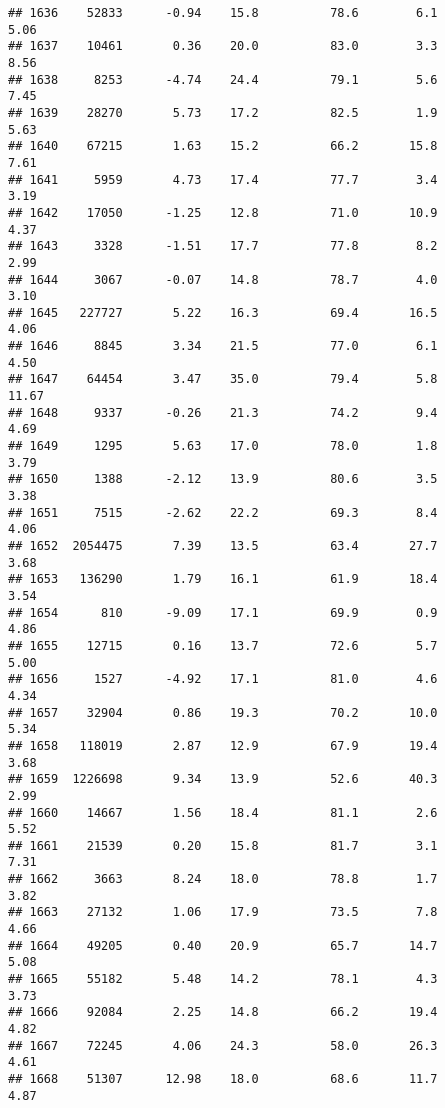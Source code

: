 \documentclass[
]{article}
\begin{document}
\begin{verbatim}
## 1636    52833      -0.94    15.8          78.6        6.1              5.06
## 1637    10461       0.36    20.0          83.0        3.3              8.56
## 1638     8253      -4.74    24.4          79.1        5.6              7.45
## 1639    28270       5.73    17.2          82.5        1.9              5.63
## 1640    67215       1.63    15.2          66.2       15.8              7.61
## 1641     5959       4.73    17.4          77.7        3.4              3.19
## 1642    17050      -1.25    12.8          71.0       10.9              4.37
## 1643     3328      -1.51    17.7          77.8        8.2              2.99
## 1644     3067      -0.07    14.8          78.7        4.0              3.10
## 1645   227727       5.22    16.3          69.4       16.5              4.06
## 1646     8845       3.34    21.5          77.0        6.1              4.50
## 1647    64454       3.47    35.0          79.4        5.8             11.67
## 1648     9337      -0.26    21.3          74.2        9.4              4.69
## 1649     1295       5.63    17.0          78.0        1.8              3.79
## 1650     1388      -2.12    13.9          80.6        3.5              3.38
## 1651     7515      -2.62    22.2          69.3        8.4              4.06
## 1652  2054475       7.39    13.5          63.4       27.7              3.68
## 1653   136290       1.79    16.1          61.9       18.4              3.54
## 1654      810      -9.09    17.1          69.9        0.9              4.86
## 1655    12715       0.16    13.7          72.6        5.7              5.00
## 1656     1527      -4.92    17.1          81.0        4.6              4.34
## 1657    32904       0.86    19.3          70.2       10.0              5.34
## 1658   118019       2.87    12.9          67.9       19.4              3.68
## 1659  1226698       9.34    13.9          52.6       40.3              2.99
## 1660    14667       1.56    18.4          81.1        2.6              5.52
## 1661    21539       0.20    15.8          81.7        3.1              7.31
## 1662     3663       8.24    18.0          78.8        1.7              3.82
## 1663    27132       1.06    17.9          73.5        7.8              4.66
## 1664    49205       0.40    20.9          65.7       14.7              5.08
## 1665    55182       5.48    14.2          78.1        4.3              3.73
## 1666    92084       2.25    14.8          66.2       19.4              4.82
## 1667    72245       4.06    24.3          58.0       26.3              4.61
## 1668    51307      12.98    18.0          68.6       11.7              4.87

\end{verbatim}
\end{document}
